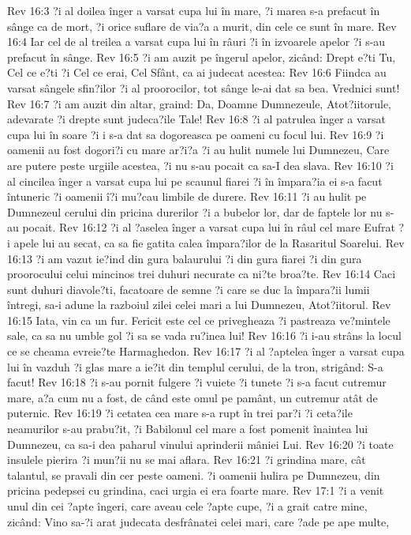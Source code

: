 Rev 16:3  ?i al doilea înger a varsat cupa lui în mare, ?i marea s-a prefacut în sânge ca de mort, ?i orice suflare de via?a a murit, din cele ce sunt în mare.
Rev 16:4  Iar cel de al treilea a varsat cupa lui în râuri ?i în izvoarele apelor ?i s-au prefacut în sânge.
Rev 16:5  ?i am auzit pe îngerul apelor, zicând: Drept e?ti Tu, Cel ce e?ti ?i Cel ce erai, Cel Sfânt, ca ai judecat acestea:
Rev 16:6  Fiindca au varsat sângele sfin?ilor ?i al proorocilor, tot sânge le-ai dat sa bea. Vrednici sunt!
Rev 16:7  ?i am auzit din altar, graind: Da, Doamne Dumnezeule, Atot?iitorule, adevarate ?i drepte sunt judeca?ile Tale!
Rev 16:8  ?i al patrulea înger a varsat cupa lui în soare ?i i s-a dat sa dogoreasca pe oameni cu focul lui.
Rev 16:9  ?i oamenii au fost dogori?i cu mare ar?i?a ?i au hulit numele lui Dumnezeu, Care are putere peste urgiile acestea, ?i nu s-au pocait ca sa-I dea slava.
Rev 16:10  ?i al cincilea înger a varsat cupa lui pe scaunul fiarei ?i în împara?ia ei s-a facut întuneric ?i oamenii î?i mu?cau limbile de durere.
Rev 16:11  ?i au hulit pe Dumnezeul cerului din pricina durerilor ?i a bubelor lor, dar de faptele lor nu s-au pocait.
Rev 16:12  ?i al ?aselea înger a varsat cupa lui în râul cel mare Eufrat ?i apele lui au secat, ca sa fie gatita calea împara?ilor de la Rasaritul Soarelui.
Rev 16:13  ?i am vazut ie?ind din gura balaurului ?i din gura fiarei ?i din gura proorocului celui mincinos trei duhuri necurate ca ni?te broa?te.
Rev 16:14  Caci sunt duhuri diavole?ti, facatoare de semne ?i care se duc la împara?ii lumii întregi, sa-i adune la razboiul zilei celei mari a lui Dumnezeu, Atot?iitorul.
Rev 16:15  Iata, vin ca un fur. Fericit este cel ce privegheaza ?i pastreaza ve?mintele sale, ca sa nu umble gol ?i sa se vada ru?inea lui!
Rev 16:16  ?i i-au strâns la locul ce se cheama evreie?te Harmaghedon.
Rev 16:17  ?i al ?aptelea înger a varsat cupa lui în vazduh ?i glas mare a ie?it din templul cerului, de la tron, strigând: S-a facut!
Rev 16:18  ?i s-au pornit fulgere ?i vuiete ?i tunete ?i s-a facut cutremur mare, a?a cum nu a fost, de când este omul pe pamânt, un cutremur atât de puternic.
Rev 16:19  ?i cetatea cea mare s-a rupt în trei par?i ?i ceta?ile neamurilor s-au prabu?it, ?i Babilonul cel mare a fost pomenit înaintea lui Dumnezeu, ca sa-i dea paharul vinului aprinderii mâniei Lui.
Rev 16:20  ?i toate insulele pierira ?i mun?ii nu se mai aflara.
Rev 16:21  ?i grindina mare, cât talantul, se pravali din cer peste oameni. ?i oamenii hulira pe Dumnezeu, din pricina pedepsei cu grindina, caci urgia ei era foarte mare.
Rev 17:1  ?i a venit unul din cei ?apte îngeri, care aveau cele ?apte cupe, ?i a grait catre mine, zicând: Vino sa-?i arat judecata desfrânatei celei mari, care ?ade pe ape multe,

